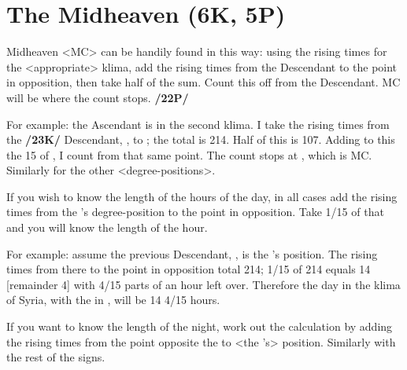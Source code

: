 \section{The Midheaven (6K, 5P)}

Midheaven <MC> can be handily found in this way: using the rising times for the <appropriate> klima, add the rising times from the Descendant to the point in opposition, then take half of the sum.
Count this off from the Descendant. MC will be where the count stops. \textbf{/22P/} 

For example: the Ascendant is \Capricorn\xspace 15\deg\xspace in the second klima. I take the rising times from the \textbf{/23K/} Descendant, \Cancer\xspace 15\deg, to \Capricorn\xspace 15\deg; the total is 214. Half of this is 107. Adding to this the 15\deg\xspace of \Cancer, I count from that same point. The count stops at \Scorpio\xspace 2\deg, which is MC. Similarly for the other <degree-positions>.

If you wish to know the length of the hours of the day, in all cases add the rising times from the \Sun’s degree-position to the point in opposition. Take 1/15 of that and you will know the length of the hour.

For example: assume the previous Descendant, \Cancer\xspace 15\deg, is the \Sun’s position. The rising times from there to the point in opposition total 214; 1/15 of 214 equals 14 [remainder 4] with 4/15 parts of an hour left over. Therefore the day in the klima of Syria, with the \Sun\xspace in \Cancer\xspace 15\deg, will be 14 4/15 hours. 

If you want to know the length of the night, work out the calculation by adding the rising times from the point opposite the \Sun\xspace to <the \Sun’s> position. Similarly with the rest of the signs.

\newpage